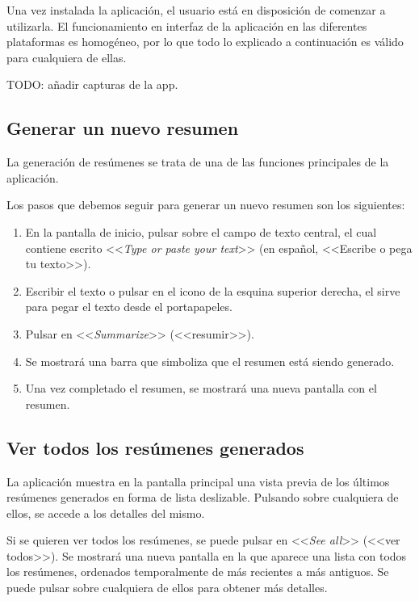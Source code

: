 Una vez instalada la aplicación, el usuario está en disposición de comenzar a utilizarla. El funcionamiento en interfaz de la aplicación en las diferentes plataformas es homogéneo, por lo que todo lo explicado a continuación es válido para cualquiera de ellas.

TODO: añadir capturas de la app.

\subsection{Generar un nuevo resumen}

La generación de resúmenes se trata de una de las funciones principales de la aplicación.

Los pasos que debemos seguir para generar un nuevo resumen son los siguientes:

\begin{enumerate}
	\item En la pantalla de inicio, pulsar sobre el campo de texto central, el cual contiene escrito <<\emph{Type or paste your text}>> (en español, <<Escribe o pega tu texto>>).
	
	\item Escribir el texto o pulsar en el icono de la esquina superior derecha, el sirve para pegar el texto desde el portapapeles.
	
	\item Pulsar en <<\emph{Summarize}>> (<<resumir>>).
	
	\item Se mostrará una barra que simboliza que el resumen está siendo generado.
	
	\item Una vez completado el resumen, se mostrará una nueva pantalla con el resumen.
\end{enumerate}


\subsection{Ver todos los resúmenes generados}

La aplicación muestra en la pantalla principal una vista previa de los últimos resúmenes generados en forma de lista deslizable. Pulsando sobre cualquiera de ellos, se accede a los detalles del mismo.

Si se quieren ver todos los resúmenes, se puede pulsar en <<\emph{See all}>> (<<ver todos>>). Se mostrará una nueva pantalla en la que aparece una lista con todos los resúmenes, ordenados temporalmente de más recientes a más antiguos. Se puede pulsar sobre cualquiera de ellos para obtener más detalles.


